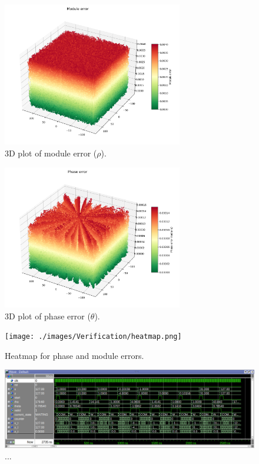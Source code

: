 \begin{figure}[H]
    \centering
    \includegraphics[width=0.7\textwidth]{./images/Verification/module_error.png}
    \caption{3D plot of module error (\( \rho \)).}
    \label{fig:module_error}
\end{figure}

\begin{figure}[H]
    \centering
    \includegraphics[width=0.7\textwidth]{./images/Verification/phase_error.png}
    \caption{3D plot of phase error (\( \theta \)).}
    \label{fig:phase_error}
\end{figure}

\begin{figure}[H]
    \centering
    \texttt{[image: ./images/Verification/heatmap.png]}
    \caption{Heatmap for phase and module errors.}
    \label{fig:heatmap_error}
\end{figure}



\begin{figure}[!ht]
    \centering
    \includegraphics[width=\textwidth]{./images/Verification/wavebig.png}
    \caption{...}
    \label{fig:wavebig}
\end{figure}


